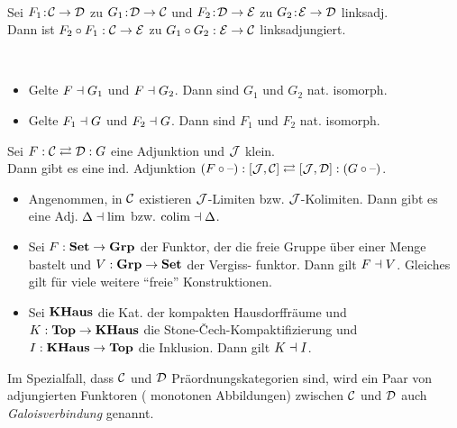 \documentclass{cheat-sheet}
\begin{document}
\begin{lem}\mbox{}\\
  Sei $F_1 \!:\! \mathcal{C} \to \mathcal{D}$ zu $G_1 \!:\! \mathcal{D} \to \mathcal{C}$ und $F_2 \!:\! \mathcal{D} \to \mathcal{E}$ zu $G_2 \!:\! \mathcal{E} \to \mathcal{D}$ linksadj. \\
  Dann ist $F_2 \circ F_1 : \mathcal{C} \to \mathcal{E}$ zu $G_1 \circ G_2 : \mathcal{E} \to \mathcal{C}$ linksadjungiert.
\end{lem}

\begin{lem}\mbox{}\\
  \begin{itemize}
    \item Gelte $F \dashv G_1$ und $F \dashv G_2$. Dann sind $G_1$ und $G_2$ nat. isomorph.
    \item Gelte $F_1 \dashv G$ und $F_2 \dashv G$. Dann sind $F_1$ und $F_2$ nat. isomorph.
  \end{itemize}
\end{lem}

\begin{bem}
  Sei $F : \mathcal{C} \rightleftarrows \mathcal{D} : G$ eine Adjunktion und $\mathcal{J}$ klein. \\
  Dann gibt es eine ind. Adjunktion $(F \circ \text{--}) : [\mathcal{J}, \mathcal{C}] \rightleftarrows [\mathcal{J}, \mathcal{D}] : (G \circ \text{--})$.
\end{bem}

\begin{bspe}
  \begin{itemize}
    \item Angenommen, in $\mathcal{C}$ existieren $\mathcal{J}$-Limiten bzw. $\mathcal{J}$-Kolimiten. Dann gibt es eine Adj.
    $\Delta \dashv \lim$
    bzw.
    $\operatorname{colim} \dashv \Delta$.
    \item Sei $F : \mathbf{Set} \to \mathbf{Grp}$ der Funktor, der die freie Gruppe über einer Menge bastelt und $V : \mathbf{Grp} \to \mathbf{Set}$ der Vergiss- funktor. Dann gilt $F \dashv V$. Gleiches gilt für viele weitere "`freie"' Konstruktionen.
    \item Sei $\mathbf{KHaus}$ die Kat. der kompakten Hausdorffräume und $K : \mathbf{Top} \to \mathbf{KHaus}$ die Stone-Čech-Kompaktifizierung und $I : \mathbf{KHaus} \to \mathbf{Top}$ die Inklusion. Dann gilt $K \dashv I$.
  \end{itemize}
\end{bspe}

\begin{defn}
  Im Spezialfall, dass $\mathcal{C}$ und $\mathcal{D}$ Präordnungskategorien sind, wird ein Paar von adjungierten Funktoren (\dh{} monotonen Abbildungen) zwischen $\mathcal{C}$ und $\mathcal{D}$ auch \emph{Galoisverbindung} genannt.
\end{defn}
\end{document}

